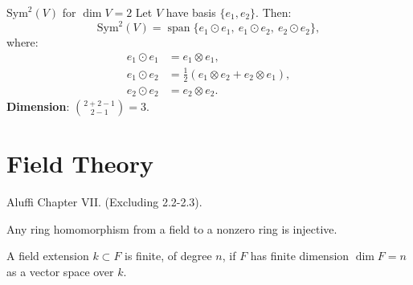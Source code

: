 \documentclass[openany]{book}
\newcommand{\Sym}{\text{Sym}} %
\newcommand{\tensor}{\otimes} %
\begin{document}
\begin{example}
    $\Sym^2(V)$ for $\dim V = 2$
Let $V$ have basis $\{e_1, e_2\}$. Then:
\[
\Sym^2(V) = \operatorname{span}\{e_1 \odot e_1, \ e_1 \odot e_2, \ e_2 \odot e_2\},
\]
where:
\begin{align*}
    e_1 \odot e_1 &= e_1 \tensor e_1, \\
    e_1 \odot e_2 &= \frac{1}{2}(e_1 \tensor e_2 + e_2 \tensor e_1), \\
    e_2 \odot e_2 &= e_2 \tensor e_2.
\end{align*}
\textbf{Dimension}: $\binom{2 + 2 - 1}{2 - 1} = 3$.
\end{example}
























































\chapter{Field Theory}

Aluffi Chapter VII. (Excluding 2.2-2.3).


\begin{prop}
    Any ring homomorphism from a field to a nonzero ring is injective.
\end{prop}


\begin{defn}
    A field extension $k\subset F$ is finite, of degree $n$, if $F$ has finite dimension $\dim F=n$ as a vector space over $k$.
\end{defn}
\end{document}

